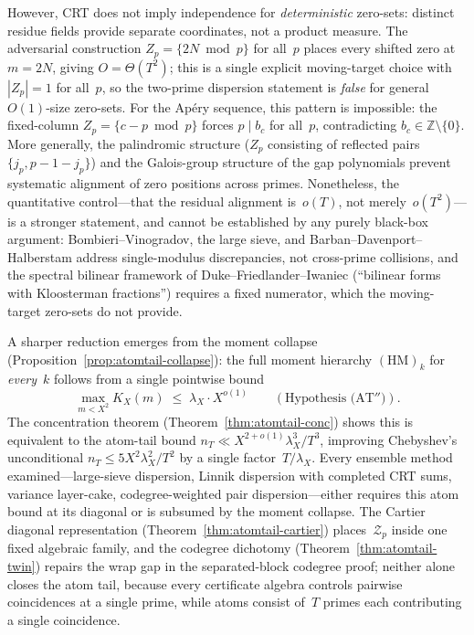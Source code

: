 \documentclass[11pt]{article}
\theoremstyle{definition}
\theoremstyle{remark}
\begin{document}
However, CRT does not imply
independence for \emph{deterministic}
zero-sets: distinct residue fields
provide separate coordinates,
not a product measure.
The adversarial construction
$Z_p = \{2N \bmod p\}$ for all~$p$
places every shifted zero at $m = 2N$,
giving $O = \Theta(T^2)$; this is a single
explicit moving-target choice with
$|Z_p| = 1$ for all~$p$, so the
two-prime dispersion statement is
\emph{false} for general~$O(1)$-size
zero-sets.
For the Ap\'ery sequence, this
pattern is impossible: the fixed-column
$Z_p = \{c - p \bmod p\}$ forces
$p \mid b_c$ for all~$p$, contradicting
$b_c \in \mathbb{Z} \setminus \{0\}$.
More generally, the palindromic
structure ($Z_p$ consisting of
reflected pairs
$\{j_p, p{-}1{-}j_p\}$) and the
Galois-group structure of the gap
polynomials prevent systematic
alignment of zero positions across primes.
Nonetheless, the quantitative
control---that the residual alignment
is~$o(T)$, not merely~$o(T^2)$---is a
stronger statement, and cannot be
established by any purely black-box
argument: Bombieri--Vinogradov, the
large sieve, and Barban--Davenport--Halberstam
address single-modulus
discrepancies, not cross-prime collisions,
and the spectral bilinear framework of
Duke--Friedlander--Iwaniec (``bilinear forms
with Kloosterman fractions'') requires
a fixed numerator, which the moving-target
zero-sets do not provide.

A sharper reduction emerges from the moment collapse
(Proposition~\ref{prop:atomtail-collapse}):
the full moment hierarchy $(\mathrm{HM})_k$
for \emph{every}~$k$ follows from a single pointwise bound
\[
  \max_{m < X^2} K_X(m) \;\le\; \lambda_X \cdot X^{o(1)}
  \qquad (\text{Hypothesis~(AT$''$)}).
\]
The concentration theorem
(Theorem~\ref{thm:atomtail-conc})
shows this is equivalent to the atom-tail bound
$n_T \ll X^{2+o(1)}\lambda_X^3/T^3$,
improving Chebyshev's unconditional
$n_T \le 5X^2\lambda_X^2/T^2$
by a single factor~$T/\lambda_X$.
Every ensemble method examined---large-sieve dispersion,
Linnik dispersion with completed CRT sums, variance
layer-cake, codegree-weighted pair dispersion---either
requires this atom bound at its diagonal or is subsumed
by the moment collapse.
The Cartier diagonal representation
(Theorem~\ref{thm:atomtail-cartier}) places~$\mathcal{Z}_p$
inside one fixed algebraic family,
and the codegree dichotomy
(Theorem~\ref{thm:atomtail-twin}) repairs the
wrap gap in the separated-block codegree proof;
neither alone closes the atom tail,
because every certificate algebra controls
pairwise coincidences at a single prime,
while atoms consist of~$T$ primes
each contributing a single coincidence.
\end{document}
